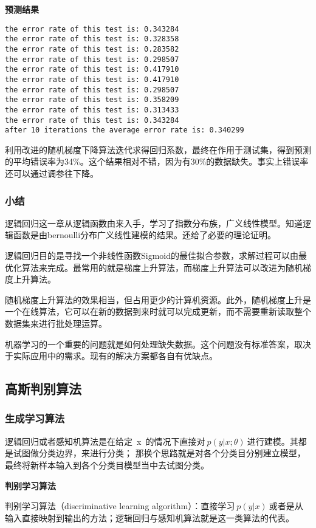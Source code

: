 \noindent\textbf{预测结果}\par
\begin{lstlisting}
the error rate of this test is: 0.343284
the error rate of this test is: 0.328358
the error rate of this test is: 0.283582
the error rate of this test is: 0.298507
the error rate of this test is: 0.417910
the error rate of this test is: 0.417910
the error rate of this test is: 0.298507
the error rate of this test is: 0.358209
the error rate of this test is: 0.313433
the error rate of this test is: 0.343284
after 10 iterations the average error rate is: 0.340299
\end{lstlisting}

利用改进的随机梯度下降算法迭代求得回归系数，最终在作用于测试集，得到预测的平均错误率为34\%。这个结果相对不错，因为有30\%的数据缺失。事实上错误率还可以通过调参往下降。

\subsubsection{小结}
逻辑回归这一章从逻辑函数由来入手，学习了指数分布族，广义线性模型。知道逻辑函数是由bernoulli分布广义线性建模的结果。还给了必要的理论证明。

逻辑回归目的是寻找一个非线性函数Sigmoid的最佳拟合参数，求解过程可以由最优化算法来完成。最常用的就是梯度上升算法，而梯度上升算法可以改进为随机梯度上升算法。

随机梯度上升算法的效果相当，但占用更少的计算机资源。此外，随机梯度上升是一个在线算法，它可以在新的数据到来时就可以完成更新，而不需要重新读取整个数据集来进行批处理运算。

机器学习的一个重要的问题就是如何处理缺失数据。这个问题没有标准答案，取决于实际应用中的需求。现有的解决方案都各自有优缺点。

\newpage



\subsection{高斯判别算法}
\subsubsection{生成学习算法}
逻辑回归或者感知机算法是在给定~x~的情况下直接对$~p(y|x;\theta)~$进行建模。其都是试图做分类边界，来进行分类；
那换个思路就是对各个分类目分别建立模型，最终将新样本输入到各个分类目模型当中去试图分类。

\noindent\textbf{判别学习算法}\par
判别学习算法（discriminative learning algorithm）：直接学习$~p(y|x)~$或者是从输入直接映射到输出的方法；逻辑回归与感知机算法就是这一类算法的代表。

